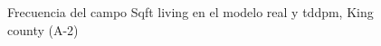 \begin{figure}[H]
    \centering
    
    \caption{Frecuencia del campo Sqft living en el modelo real y tddpm, King county (A-2)}
    \label{frecuency-tddpm-sqft living}
\end{figure}